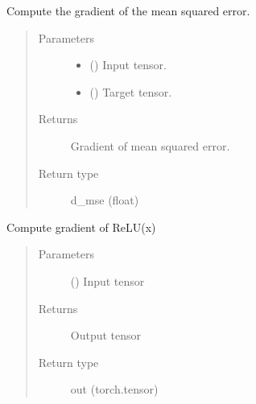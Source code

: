 \documentclass[letterpaper,10pt,english]{sphinxmanual}
\begin{document}
\begin{fulllineitems}
\label{\detokenize{nn:nn.functional.d_mse}}
Compute the gradient of the mean squared error.
\begin{quote}\begin{description}
\item[{Parameters}] \leavevmode\begin{itemize}
\item {} 
 () \textendash{} Input tensor.

\item {} 
 () \textendash{} Target tensor.

\end{itemize}

\item[{Returns}] \leavevmode
Gradient of mean squared error.

\item[{Return type}] \leavevmode
d\_mse (float)

\end{description}\end{quote}

\end{fulllineitems}


\begin{fulllineitems}
\label{\detokenize{nn:nn.functional.d_relu}}
Compute gradient of ReLU(x)
\begin{quote}\begin{description}
\item[{Parameters}] \leavevmode
{} () \textendash{} Input tensor

\item[{Returns}] \leavevmode
Output tensor

\item[{Return type}] \leavevmode
out (torch.tensor)

\end{description}\end{quote}

\end{fulllineitems}
\end{document}
